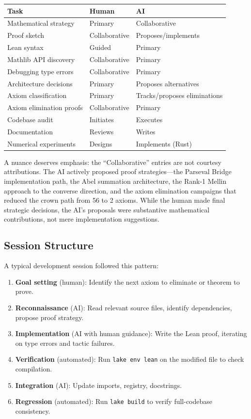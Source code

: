 \documentclass[11pt,a4paper]{article}
\begin{document}
\begin{center}
\begin{tabular}{@{}lll@{}}
\toprule
\textbf{Task} & \textbf{Human} & \textbf{AI} \\
\midrule
Mathematical strategy & Primary & Collaborative \\
Proof sketch & Collaborative & Proposes/implements \\
Lean syntax & Guided & Primary \\
Mathlib API discovery & Collaborative & Primary \\
Debugging type errors & Collaborative & Primary \\
Architecture decisions & Primary & Proposes alternatives \\
Axiom classification & Primary & Tracks/proposes eliminations \\
Axiom elimination proofs & Collaborative & Primary \\
Codebase audit & Initiates & Executes \\
Documentation & Reviews & Writes \\
Numerical experiments & Designs & Implements (Rust) \\
\bottomrule
\end{tabular}
\end{center}

A nuance deserves emphasis: the ``Collaborative'' entries are not
courtesy attributions. The AI actively proposed proof strategies---the
Parseval Bridge implementation path, the Abel summation architecture,
the Rank-1 Mellin approach to the converse direction, and the axiom
elimination campaigns that reduced the crown path from 56 to 2 axioms.
While the human made final strategic decisions, the AI's proposals
were substantive mathematical contributions, not mere implementation
suggestions.

\subsection{Session Structure}

A typical development session followed this pattern:

\begin{enumerate}
  \item \textbf{Goal setting} (human): Identify the next axiom to
    eliminate or theorem to prove.
  \item \textbf{Reconnaissance} (AI): Read relevant source files,
    identify dependencies, propose proof strategy.
  \item \textbf{Implementation} (AI with human guidance): Write the
    Lean proof, iterating on type errors and tactic failures.
  \item \textbf{Verification} (automated): Run \texttt{lake env lean}
    on the modified file to check compilation.
  \item \textbf{Integration} (AI): Update imports, registry, docstrings.
  \item \textbf{Regression} (automated): Run \texttt{lake build} to
    verify full-codebase consistency.
\end{enumerate}
\end{document}
